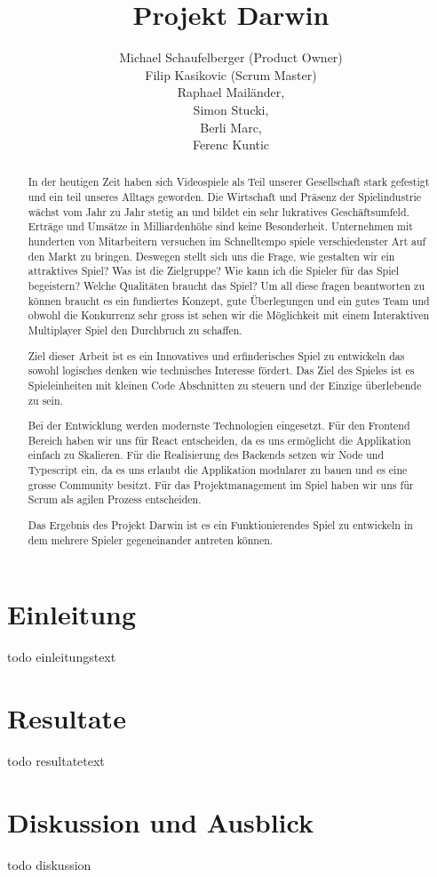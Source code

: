 \documentclass[11pt,a4paper,titlepage]{article}
\author{Michael Schaufelberger (Product Owner)\\
Filip Kasikovic (Scrum Master)\\
Raphael Mailänder,\\
Simon Stucki,\\
Berli Marc,\\
Ferenc Kuntic}
\title{Projekt Darwin}
\begin{document}
\maketitle


\begin{abstract}

In der heutigen Zeit haben sich Videospiele als Teil unserer Gesellschaft stark gefestigt und ein teil unseres Alltags geworden. Die Wirtschaft und Präsenz der Spielindustrie wächst vom Jahr zu Jahr stetig an und bildet ein sehr lukratives Geschäftsumfeld. Erträge und Umsätze in Milliardenhöhe sind keine Besonderheit. Unternehmen mit hunderten von Mitarbeitern versuchen im Schnelltempo spiele verschiedenster Art auf den Markt zu bringen. 
Deswegen stellt sich uns die Frage, wie gestalten wir ein attraktives Spiel? Was ist die Zielgruppe? Wie kann ich die Spieler für das Spiel begeistern? Welche Qualitäten braucht das Spiel?
Um all diese fragen beantworten zu können braucht es ein fundiertes Konzept, gute Überlegungen und ein gutes Team und obwohl die Konkurrenz sehr gross ist sehen wir die Möglichkeit mit einem Interaktiven Multiplayer Spiel den Durchbruch zu schaffen.

Ziel dieser Arbeit ist es ein Innovatives und erfinderisches Spiel zu entwickeln das sowohl logisches denken wie technisches Interesse fördert. Das Ziel des Spieles ist es Spieleinheiten mit kleinen Code Abschnitten zu steuern und der Einzige überlebende zu sein.

Bei der Entwicklung werden modernste Technologien eingesetzt. Für den Frontend Bereich haben wir uns für React entscheiden, da es uns ermöglicht die Applikation einfach zu Skalieren. Für die Realisierung des Backends setzen wir Node und Typescript ein, da es uns erlaubt die Applikation modularer zu bauen und es eine grosse Community besitzt.
Für das Projektmanagement im Spiel haben wir uns für Scrum als agilen Prozess entscheiden.

Das Ergebnis des Projekt Darwin ist es ein Funktionierendes Spiel zu entwickeln in dem mehrere Spieler gegeneinander antreten können.

\end{abstract}

\tableofcontents

\section{Einleitung}
todo einleitungstext

\section{Resultate}
todo resultatetext

\section{Diskussion und Ausblick}
todo diskussion
\end{document}
